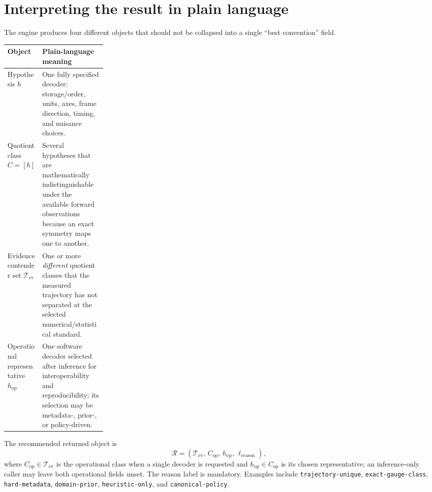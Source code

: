 \documentclass[11pt]{article}
\begin{document}
    \section{Interpreting the result in plain language}\label{sec:result}

    The engine produces four different objects that should not be collapsed into a single
    ``best convention'' field.
    \begin{center}
        \small
        \begin{tabularx}{\linewidth}{@{}p{0.23\linewidth}Y@{}}
\toprule
Object & Plain-language meaning \\
\midrule
Hypothesis $h$ & One fully specified decoder: storage/order, units, axes, frame direction, timing, and nuisance choices. \\
Quotient class $C=[h]$ & Several hypotheses that are mathematically indistinguishable under the available forward observations because an exact symmetry maps one to another. \\
Evidence contender set $\mathcal T_{\mathrm{ev}}$ & One or more \emph{different} quotient classes that the measured trajectory has not separated at the selected numerical/statistical standard. \\
Operational representative $h_{\mathrm{op}}$ & One software decoder selected after inference for interoperability and reproducibility; its selection may be metadata-, prior-, or policy-driven. \\
\bottomrule
        \end{tabularx}
    \end{center}

    The recommended returned object is
    \begin{equation}
        \boxed{
            \mathcal R=
            (\mathcal T_{\mathrm{ev}},\,C_{\mathrm{op}},\,h_{\mathrm{op}},\,
            \ell_{\mathrm{reason}}),}
        \label{eq:focused-result-object}
    \end{equation}
    where $C_{\mathrm{op}}\in\mathcal T_{\mathrm{ev}}$ is the operational class when a
    single decoder is requested and $h_{\mathrm{op}}\in C_{\mathrm{op}}$ is its chosen
    representative; an inference-only caller may leave both operational fields unset. The reason label is
    mandatory. Examples include \texttt{trajectory-unique}, \texttt{exact-gauge-class},
    \texttt{hard-metadata}, \texttt{domain-prior}, \texttt{heuristic-only}, and
    \texttt{canonical-policy}.
\end{document}

